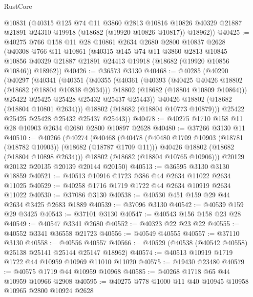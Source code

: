 \begin{lexlean}{RustCore}
\begin{coremodule}
      @10831
      (@40315
        @125
        @74
        @11
        @3860
        @2813
        @10816
        @10826
        @40329
        @21887
        @21891
        @24310
        @19918
        (@18682 (@19920 @10826 @10817))
        @18962))
@40425 := @40275
    @766
    @158
    @11
    @28
    @10861
    @2634
    @2680
    @2800
    @10837
    @2628
    (@40308
      @766
      @11
      @10861
      (@40315
        @145
        @74
        @11
        @3860
        @2813
        @10845
        @10856
        @40329
        @21887
        @21891
        @24413
        @19918
        (@18682 (@19920 @10856 @10846))
        @18962))
@40426 := @36573 @3130
@40468 := @40285
    (@40290
      (@40297
        (@40341
          (@40351
            (@40355
              (@40361
                (@40393
                  (@40425 @40426 @18802 (@18682 (@18804 @10838 @2634)))
                  @18802
                  (@18682 (@18804 @10809 @10864)))
                @25422
                @25425
                @25428
                @25432
                @25437
                @25443))
            @40426
            @18802
            (@18682 (@18804 @10801 @2634)))
          @18802
          (@18682 (@18804 @10773 @10879)))
        @25422
        @25425
        @25428
        @25432
        @25437
        @25443))
@40478 := @40275 @1710 @158 @11 @28 @10903 @2634 @2680 @2800 @10897 @2628
@40480 := @37266 @3130 @11
@40510 := @40266
    (@40274
      (@40468
        (@40478
          (@40480 @1709 @10903 (@18781 (@18782 @10903)) (@18682 (@18787 @1709 @11)))
          @40426
          @18802
          (@18682 (@18804 @10898 @2634)))
        @18802
        (@18682 (@18804 @10765 @10906)))
      @20129
      @20132
      @20135
      @20139
      @20144
      @20150)
@40513 := @36595 @3130 @3130 @18859
@40521 := @40513 @10916 @1723 @386 @44 @2634 @11022 @2634 @11025
@40529 := @40258 @1716 @1719 @1722 @44 @2634 @10919 @2634 @11022
@40530 := @37086 @3130
@40538 := @40530 @451 @159 @29 @44 @2634 @3425 @2683 @1889
@40539 := @37096 @3130
@40542 := @40539 @159 @29 @3425
@40543 := @37101 @3130
@40547 := @40543 @156 @158 @23 @28
@40549 := @40547 @3341 @2680
@40552 := @40323 @22 @23 @22
@40555 := @40552 @3341 @36558 @21723
@40556 := @40549 @40555
@40557 := @37110 @3130
@40558 := @40556 @40557
@40566 := @40529 (@40538 (@40542 @40558) @25138 @25141 @25144 @25147 @18962)
@40574 := @40513 @10919 @1719 @1722 @44 @10959 @10969 @11010 @11020
@40575 := @19430 @23480
@40579 := @40575 @1719 @44 @10959 @10968
@40585 := @40268 @1718 @65 @44 @10959 @10966 @2908
@40595 := @40275 @778 @1000 @11 @40 @10945 @10958 @10965 @2800 @10924 @2628

\end{coremodule}
\end{lexlean}
